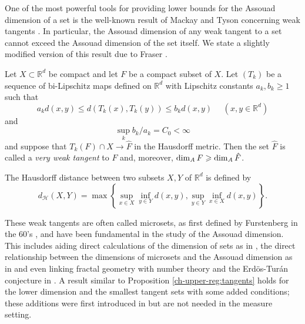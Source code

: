 One of the most powerful tools for providing lower bounds for the Assouad dimension of a set is the well-known result of Mackay and Tyson concerning weak tangents \cite[Proposition 6.1.5]{mackaytyson}. In particular, the Assouad dimension of any weak tangent to a set cannot exceed the Assouad dimension of the set itself. We state a slightly modified version of this result due to Fraser \cite[Proposition 7.7]{fraser}. 
\begin{proposition}\label{ch-upper-reg:tangents}
Let $X\subset \mathbb{R}^d$ be compact and let $F$ be a compact subset of $X$. Let $(T_k)$ be a sequence of bi-Lipschitz maps defined on $\mathbb{R}^d$ with Lipschitz constants $a_k, b_k \ge 1$ such that 
\[
a_k d(x,y) \leq d( T_k(x) , T_k(y) ) \leq b_k d( x, y)  \,\,\,\,\,\,\,\, (x,y\in\mathbb{R}^d)
\]
and
\[
\sup_k b_k / a_k = C_0 <\infty
\]
and suppose that $T_k(F) \cap X \rightarrow \hat{F}$ in the Hausdorff metric. Then the set $\hat F$ is called a \emph{very weak tangent} to $F$ and, moreover,  $\dim_{\text{\emph{A}}} F \geq \dim_{\text{\emph{A}}} \hat{F}$.
\end{proposition}
The Hausdorff distance between two subsets $X,Y$ of $\mathbb{R}^d$ is defined by
\[
d_{\mathcal{H}}(X,Y) = \max\left\{\sup_{x\in X} \inf_{y \in Y} d(x,y), \sup_{y\in Y} \inf_{x \in X} d(x,y)\right\}.
\]


These weak tangents are often called microsets, as first defined by Furstenberg in the 60's \cite{furstenberg70, furstenberg}, and have been fundamental in the study of the Assouad dimension. This includes aiding direct calculations of the dimension of sets as in \cite{fraser-howroyd1}, the direct relationship between the dimensions of microsets and the Assouad dimension as in \cite{kaenmaki-assouad, microsets} and even linking fractal geometry with number theory and the Erd\"os-Tur\'an conjecture in \cite{FY}. A result similar to Proposition \ref{ch-upper-reg:tangents} holds for the lower dimension and the smallest tangent sets with some added conditions; these additions were first introduced in \cite{fraser} but are not needed in the measure setting.


